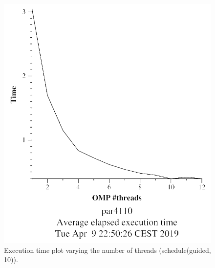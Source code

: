\documentclass[12pt, a4paper]{article}
\begin{document}
\begin{figure}[H]
\centering
\begin{minipage}[b]{0.4\linewidth}
  \centering
  \includegraphics[scale=0.5]{./mandel-omp-10000-strong-omp-for-guided-800-time}
  \caption{Execution time plot varying the number of threads (schedule(guided, 10)).}
  \label{fig:mandel-omp-10000-strong-omp-for-guided-800-time}
\end{minipage}%
\hspace{0.5cm}
\begin{minipage}[b]{0.4\linewidth}
  \centering

\end{minipage}
\end{figure}
\end{document}
